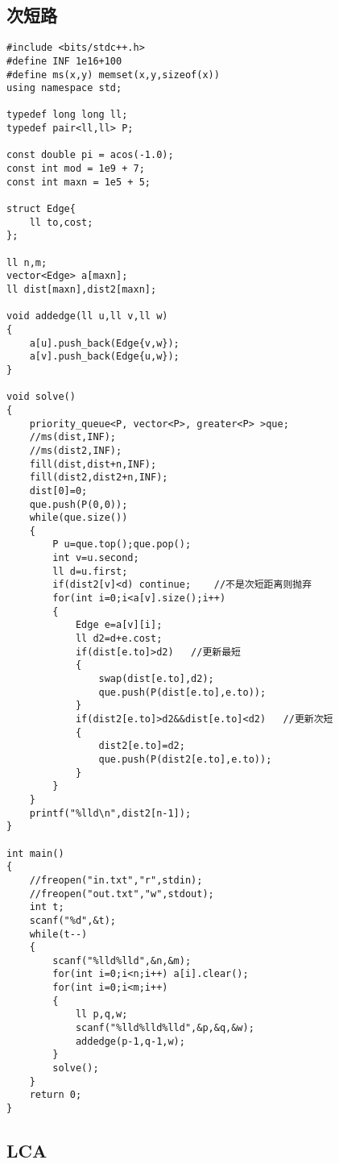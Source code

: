 \subsection{次短路}
\begin{lstlisting}
#include <bits/stdc++.h>
#define INF 1e16+100
#define ms(x,y) memset(x,y,sizeof(x))
using namespace std;

typedef long long ll;
typedef pair<ll,ll> P;

const double pi = acos(-1.0);
const int mod = 1e9 + 7;
const int maxn = 1e5 + 5;

struct Edge{
	ll to,cost;
};

ll n,m;
vector<Edge> a[maxn];
ll dist[maxn],dist2[maxn];

void addedge(ll u,ll v,ll w)
{
	a[u].push_back(Edge{v,w});
	a[v].push_back(Edge{u,w});
}

void solve()
{
	priority_queue<P, vector<P>, greater<P> >que;
	//ms(dist,INF);
	//ms(dist2,INF);
	fill(dist,dist+n,INF);
	fill(dist2,dist2+n,INF);
	dist[0]=0;
	que.push(P(0,0));
	while(que.size())
	{
		P u=que.top();que.pop();
		int v=u.second;
		ll d=u.first;
		if(dist2[v]<d) continue;	//不是次短距离则抛弃
		for(int i=0;i<a[v].size();i++)
		{
			Edge e=a[v][i];
			ll d2=d+e.cost;
			if(dist[e.to]>d2)	//更新最短
			{
				swap(dist[e.to],d2);
				que.push(P(dist[e.to],e.to));
			}
			if(dist2[e.to]>d2&&dist[e.to]<d2)	//更新次短
			{
				dist2[e.to]=d2;
				que.push(P(dist2[e.to],e.to));
			}
		}
	}
	printf("%lld\n",dist2[n-1]);
}

int main()
{
	//freopen("in.txt","r",stdin);
	//freopen("out.txt","w",stdout);
	int t;
	scanf("%d",&t);
	while(t--)
	{
		scanf("%lld%lld",&n,&m);
		for(int i=0;i<n;i++) a[i].clear();
		for(int i=0;i<m;i++)
		{
			ll p,q,w;
			scanf("%lld%lld%lld",&p,&q,&w);
			addedge(p-1,q-1,w);
		}
		solve();
	}
	return 0;
}
\end{lstlisting}

\subsection{LCA}
